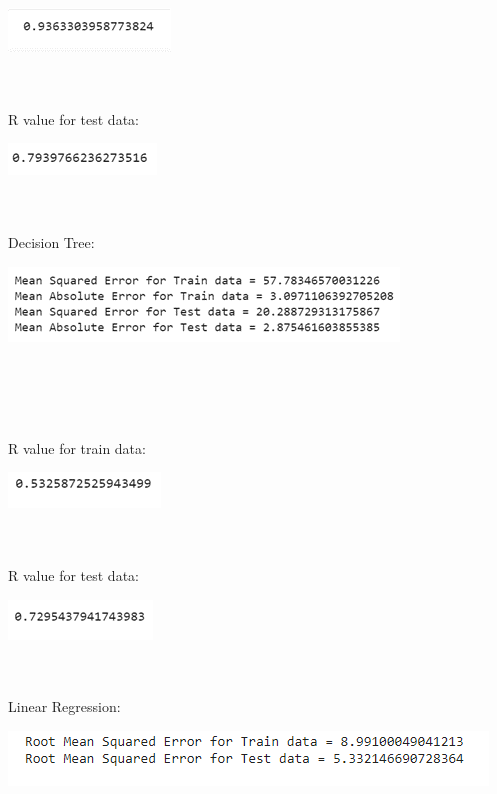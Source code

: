 \documentclass[journal,twoside,web]{ieeecolor}
\begin{document}
\begin{center}
\includegraphics[scale=0.60]{Picture16.png}
\end{center}
\\
\\
R value for test data:
\begin{center}
\includegraphics[scale=0.60]{Picture17.png}
\end{center}
\\
\\
Decision Tree:
\begin{center}
\includegraphics[scale=0.60]{Picture18.png}
\end{center}
\\
\\
\\
\\
R value for train data:
\begin{center}
\includegraphics[scale=0.60]{Picture19.png}
\end{center}
\\
\\
R value for test data:
\begin{center}
\includegraphics[scale=0.60]{Picture20.png}
\end{center}
\\
\\
Linear Regression:
\begin{center}
\includegraphics[scale=0.60]{Picture26.png}
\end{center}
\end{document}
